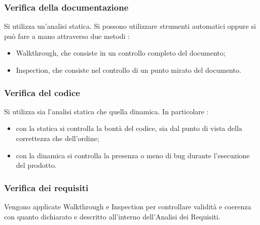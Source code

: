 \subsubsection{Verifica della documentazione}
Si utilizza un’analisi statica. Si possono utilizzare strumenti automatici oppure si può fare a mano attraverso due metodi :
\begin{itemize}
\item Walkthrough, che consiste in un controllo completo del documento;
\item Inspection, che consiste nel controllo di un punto mirato del documento.
\end{itemize}

\subsubsection{Verifica del codice}
Si utilizza sia l’analisi statica che quella dinamica. In particolare :
\begin{itemize}
\item con la statica si controlla la bontà del codice, sia dal punto di vista della correttezza che dell’ordine;
\item con la dinamica si controlla la presenza o meno di bug durante l’esecuzione del prodotto.
\end{itemize}

\subsubsection{Verifica dei requisiti}
Vengono applicate Walkthrough e Inspection per controllare validità e coerenza con quanto dichiarato e descritto all’interno dell’Analisi dei Requisiti.

